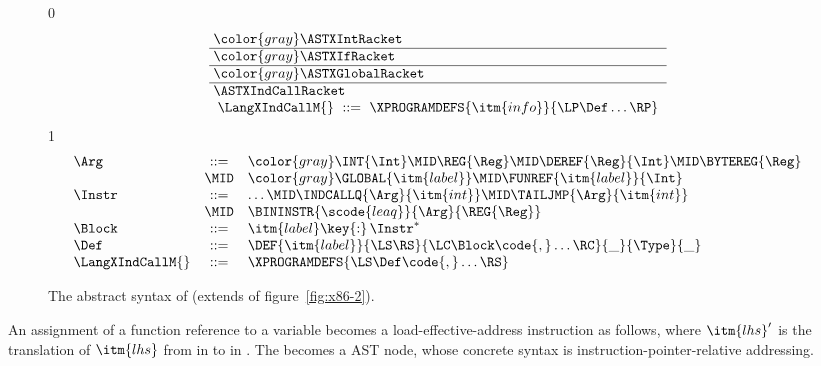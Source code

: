 \documentclass[7x10]{TimesAPriori_MIT}%
\newcommand{\gray}[1]{{\color{gray} #1}}
\def\racketEd{0}
\def\pythonEd{1}
\def\edition{1}
\newcommand{\pythonColor}[0]{}
\numberwithin{theorem}{chapter}
\numberwithin{definition}{chapter}
\numberwithin{equation}{chapter}
\begin{document}
\begin{figure}[tp]
  \begin{tcolorbox}[colback=white]
    \small
{\if\edition\racketEd
\[\arraycolsep=3pt
\begin{array}{l}
  \gray{\ASTXIntRacket} \\ \hline
  \gray{\ASTXIfRacket} \\ \hline
  \gray{\ASTXGlobalRacket} \\ \hline
  \ASTXIndCallRacket \\
\begin{array}{lcl}
\LangXIndCallM{} &::= & \XPROGRAMDEFS{\itm{info}}{\LP\Def\ldots\RP}
\end{array}
\end{array}
\]
\fi}
{\if\edition\pythonEd\pythonColor
\[
\begin{array}{lcl}
  \Arg &::=&  \gray{  \INT{\Int} \MID \REG{\Reg} \MID \DEREF{\Reg}{\Int}
     \MID \BYTEREG{\Reg} } \\
     &\MID& \gray{ \GLOBAL{\itm{label}} } \MID \FUNREF{\itm{label}}{\Int} \\
  \Instr &::=& \ldots \MID \INDCALLQ{\Arg}{\itm{int}}
    \MID \TAILJMP{\Arg}{\itm{int}}\\
    &\MID& \BININSTR{\scode{leaq}}{\Arg}{\REG{\Reg}}\\
  \Block &::=&\itm{label}\key{:}\,\Instr^{*} \\
  \Def &::= & \DEF{\itm{label}}{\LS\RS}{\LC\Block\code{,}\ldots\RC}{\_}{\Type}{\_} \\
\LangXIndCallM{} &::= & \XPROGRAMDEFS{\LS\Def\code{,}\ldots\RS}
\end{array}
\]
\fi}
  \end{tcolorbox}
\caption{The abstract syntax of \LangXIndCall{} (extends
  \LangXGlobal{} of figure~\ref{fig:x86-2}).}
\label{fig:x86-3}
\end{figure}

An assignment of a function reference to a variable becomes a
load-effective-address instruction as follows, where $\itm{lhs}'$ is
the translation of $\itm{lhs}$ from \Atm{} in \LangCFun{} to \Arg{} in
\LangXIndCallVar{}. The  becomes a  AST
node, whose concrete syntax is instruction-pointer-relative
addressing.
\end{document}

